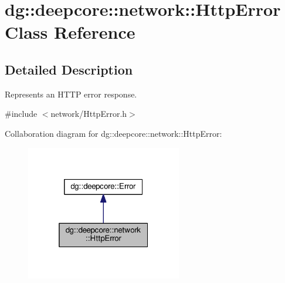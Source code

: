\hypertarget{classdg_1_1deepcore_1_1network_1_1_http_error}{}\section{dg\+:\+:deepcore\+:\+:network\+:\+:Http\+Error Class Reference}
\label{classdg_1_1deepcore_1_1network_1_1_http_error}


\subsection{Detailed Description}
Represents an H\+T\+TP error response. 

{\ttfamily \#include $<$network/\+Http\+Error.\+h$>$}



Collaboration diagram for dg\+:\+:deepcore\+:\+:network\+:\+:Http\+Error\+:
\nopagebreak
\begin{figure}[H]
\begin{center}
\leavevmode
\includegraphics[width=193pt]{classdg_1_1deepcore_1_1network_1_1_http_error__coll__graph}
\end{center}
\end{figure}
